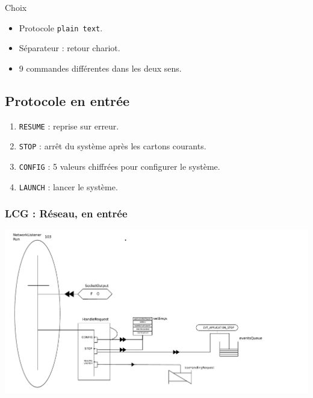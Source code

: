 \documentclass{beamer}
\begin{document}
	\begin{frame}
	    \begin{block}{Choix}
		  \begin{itemize}
		      \item Protocole \texttt{plain text}.
		      \item Séparateur : retour chariot.
		      \item 9 commandes différentes dans les deux sens.
		  \end{itemize}
	    \end{block}
	\end{frame}

	\subsection{Protocole en entrée}
	\begin{frame}
		\begin{enumerate}
		    \item \texttt{RESUME} : reprise sur erreur.
		    \item \texttt{STOP} : arrêt du système après les cartons courants.
		    \item \texttt{CONFIG} : 5 valeurs chiffrées pour configurer le système.
		    \item \texttt{LAUNCH} : lancer le système.
		\end{enumerate}
	\end{frame}

	\begin{frame}
	    \frametitle{LCG : Réseau, en entrée}
	    \includegraphics[width=\textwidth]{../../SchemasLCG/NetworkListener-run.pdf}
	\end{frame}
\end{document}
